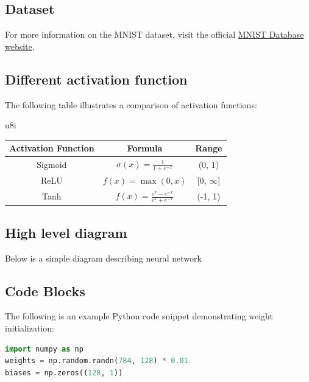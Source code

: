\documentclass[twoside]{article}
\begin{document}
\subsection{Dataset}
For more information on the MNIST dataset, visit the official \href{https://www.kaggle.com/datasets/hojjatk/mnist-dataset}{MNIST Database website}.

\subsection{Different activation function}
The following table illustrates a comparison of activation functions:
\begin{center}
\vspace{1cm}
u8i\begin{tabular}{|c|c|c|}
\hline
\textbf{Activation Function} & \textbf{Formula} & \textbf{Range} \\[5px]
\hline
Sigmoid & \( \sigma(x) = \frac{1}{1 + e^{-x}} \) & (0, 1) \\[5px]
\hline
ReLU & \( f(x) = \max(0, x) \) & [0, \( \infty \)] \\[5px]
\hline
Tanh & \( f(x) = \frac{e^x - e^{-x}}{e^x + e^{-x}} \) & (-1, 1) \\[5px]
\hline
\end{tabular}
\end{center}

\subsection{High level diagram}
Below is a simple diagram describing neural network
\begin{center}
\end{center}

\subsection{Code Blocks}
The following is an example Python code snippet demonstrating weight initialization:
\begin{lstlisting}[language=Python, caption=Weight Initialization]
import numpy as np
weights = np.random.randn(784, 128) * 0.01
biases = np.zeros((128, 1))
\end{lstlisting}
\end{document}

